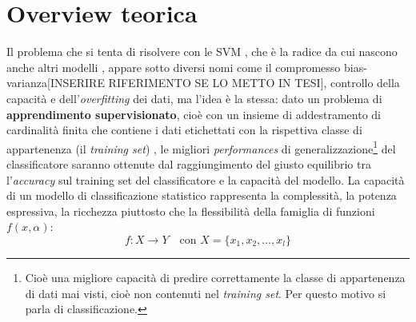 \section{Overview teorica}
Il problema che si tenta di risolvere con le \ac{SVM} , che è la radice da cui nascono anche altri modelli , appare sotto diversi nomi come il compromesso bias-varianza[INSERIRE RIFERIMENTO SE LO METTO IN TESI], controllo della capacità e dell'\textit{overfitting} dei dati, ma l'idea è la stessa: dato un problema di \textbf{apprendimento supervisionato}, cioè con un insieme di addestramento di cardinalità finita che contiene i dati etichettati con la rispettiva classe di appartenenza (il \textit{training set}) , le migliori \textit{performances} di generalizzazione\footnote{Cioè una migliore capacità di predire correttamente la classe di appartenenza di dati mai visti, cioè non contenuti nel \textit{training set}. Per questo motivo si parla di classificazione.} del classificatore saranno ottenute dal raggiungimento del giusto equilibrio tra l'\textit{accuracy} sul training set del classificatore e la capacità del modello. La capacità di un modello di classificazione statistico rappresenta la complessità, la potenza espressiva, la ricchezza piuttosto che la flessibilità della famiglia di funzioni $f(x,\alpha)$:
\begin{equation*}
f : X \to Y \quad \text{con } X=\{x_{1},x_{2},\dots,x_{l}\} 
\end{equation*}
